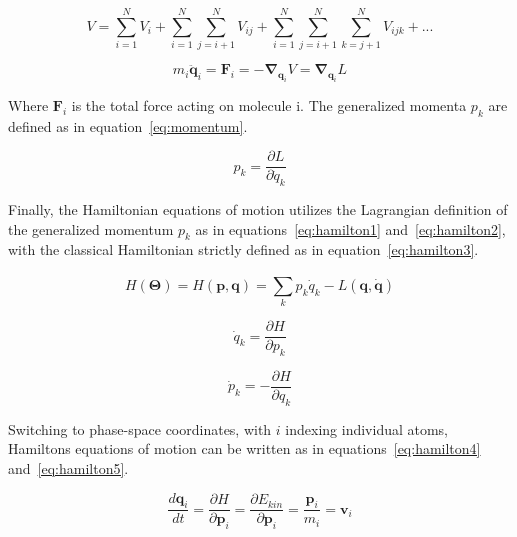\documentclass[12pt]{article}
\begin{document}
\begin{equation}
  V = \sum_{i=1}^{N}V_i + \sum_{i = 1}^{N}\sum_{j = i+1}^{N}V_{ij} + \sum_{i = 1}^{N}\sum_{j = i+1}^{N}\sum_{k = j+1}^{N}V_{ijk} + ...
  \label{eq:potential}
\end{equation}

\begin{equation}
  m_i \ddot{\textbf{q}}_i = \textbf{F}_i = -\mathbf{\nabla}_{\textbf{q}_i} V = \mathbf{\nabla}_{\textbf{q}_i} L
  \label{eq:lagrange3}
\end{equation}
\bigskip

\noindent Where $\textbf{F}_i$ is the total force acting on molecule i. The generalized momenta $p_k$ are defined as in equation~\ref{eq:momentum}.

\begin{equation}
  p_k = \frac{\partial L}{\partial \dot{q}_k}
  \label{eq:momentum}
\end{equation}

\bigskip


\noindent Finally, the Hamiltonian equations of motion utilizes the Lagrangian definition of the generalized momentum $p_k$ as in equations~\ref{eq:hamilton1} and~\ref{eq:hamilton2}, with the classical Hamiltonian strictly defined as in equation~\ref{eq:hamilton3}.

\begin{equation}
  H(\mathbf{\Theta}) = H(\textbf{p}, \textbf{q}) = \sum_{k}^{}p_k\dot{q}_k - L(\textbf{q}, \dot{\textbf{q}})
  \label{eq:hamilton3}
\end{equation}

\begin{equation}
  \dot{q}_k = \frac{\partial H}{\partial p_k}
  \label{eq:hamilton1}
\end{equation}

\begin{equation}
  \dot{p}_k = -\frac{\partial H}{\partial q_k}
  \label{eq:hamilton2}
\end{equation}



\bigskip

\noindent Switching to phase-space coordinates, with $i$ indexing individual atoms, Hamiltons equations of motion can be written as in equations~\ref{eq:hamilton4} and~\ref{eq:hamilton5}.

\begin{equation}
  \frac{d\textbf{q}_i}{dt} =\frac{\partial H}{\partial \textbf{p}_i} = \frac{\partial E_{kin}}{\partial \textbf{p}_i} =\frac{\textbf{p}_i}{m_i} = \textbf{v}_i
  \label{eq:hamilton4}
\end{equation}
\end{document}
